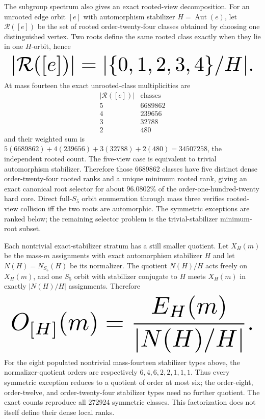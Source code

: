 \documentclass{article}
\newcommand{\fitmath}[1]{\resizebox{0.99\linewidth}{!}{$\displaystyle #1$}}
\begin{document}
The subgroup spectrum also gives an exact rooted-view decomposition. For an
unrooted edge orbit $[e]$ with automorphism stabilizer
$H=\operatorname{Aut}(e)$,
let $\mathcal R([e])$ be the set of rooted order-twenty-four classes obtained by
choosing one distinguished vertex. Two roots define the same rooted class
exactly when they lie in one $H$-orbit, hence
\begin{equation}
  \fitmath{%
    |\mathcal R([e])|=|\{0,1,2,3,4\}/H|.
  }
  \label{eq:optimization-crazy-preimage-cube-quintuple-s5-rooted-views}
\end{equation}
At mass fourteen the exact unrooted-class multiplicities are
\[
\begin{array}{c|r}
|\mathcal R([e])| & \text{classes}\\ \hline
5 & 6689862\\
4 & 239656\\
3 & 32788\\
2 & 480
\end{array}
\]
and their weighted sum is
$5(6689862)+4(239656)+3(32788)+2(480)=34507258$, the independent rooted count.
The five-view case is equivalent to trivial automorphism stabilizer. Therefore
those 6689862 classes have five distinct dense order-twenty-four rooted ranks
and a unique minimum rooted rank, giving an exact canonical root selector for
about $96.0802\%$ of the order-one-hundred-twenty hard core. Direct full-$S_5$
orbit enumeration through mass three verifies rooted-view collision iff the two
roots are automorphic. The symmetric exceptions are ranked below; the remaining
selector problem is the trivial-stabilizer minimum-root subset.

Each nontrivial exact-stabilizer stratum has a still smaller quotient. Let
$X_H(m)$ be the mass-$m$ assignments with exact automorphism stabilizer $H$ and
let $N(H)=N_{S_5}(H)$ be its normalizer. The quotient $N(H)/H$ acts freely on
$X_H(m)$, and one $S_5$ orbit with stabilizer conjugate to $H$ meets $X_H(m)$
in exactly $|N(H)/H|$ assignments. Therefore
\begin{equation}
  \fitmath{%
    O_{[H]}(m)=\frac{E_H(m)}{|N(H)/H|}.
  }
  \label{eq:optimization-crazy-preimage-cube-quintuple-s5-normalizer-strata}
\end{equation}
For the eight populated nontrivial mass-fourteen stabilizer types above, the
normalizer-quotient orders are respectively $6,4,6,2,2,1,1,1$. Thus every
symmetric exception reduces to a quotient of order at most six; the order-eight,
order-twelve, and order-twenty-four stabilizer types need no further quotient.
The exact counts reproduce all 272924 symmetric classes. This factorization
does not itself define their dense local ranks.
\end{document}

